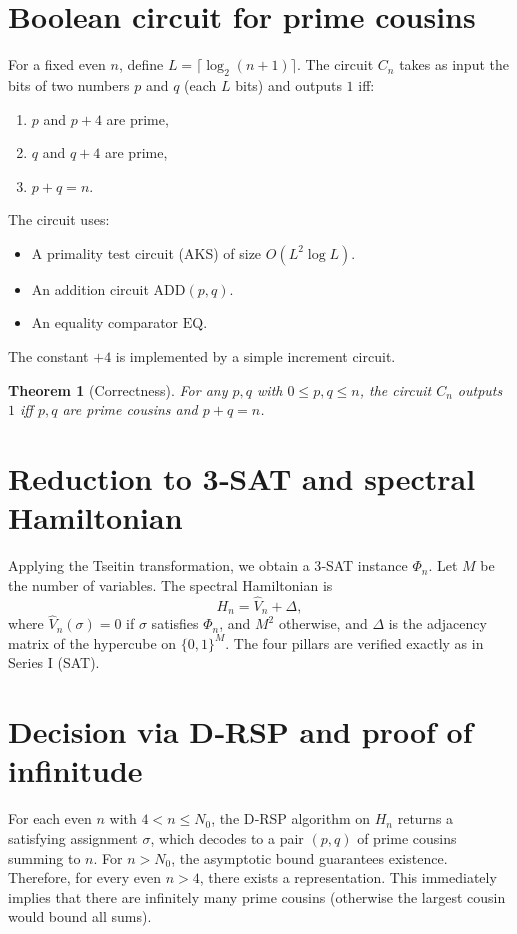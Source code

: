 \documentclass[11pt,a4paper]{article}
\newtheorem{theorem}{Theorem}[section]
\begin{document}
\section{Boolean circuit for prime cousins}

For a fixed even $n$, define $L = \lceil \log_2(n+1)\rceil$. The circuit $C_n$ takes as input the bits of two numbers $p$ and $q$ (each $L$ bits) and outputs $1$ iff:
\begin{enumerate}
\item $p$ and $p+4$ are prime,
\item $q$ and $q+4$ are prime,
\item $p+q = n$.
\end{enumerate}

The circuit uses:
\begin{itemize}
\item A primality test circuit (AKS) of size $O(L^2 \log L)$.
\item An addition circuit $\mathrm{ADD}(p,q)$.
\item An equality comparator $\mathrm{EQ}$.
\end{itemize}
The constant $+4$ is implemented by a simple increment circuit.

\begin{theorem}[Correctness]
For any $p,q$ with $0\le p,q\le n$, the circuit $C_n$ outputs $1$ iff $p,q$ are prime cousins and $p+q=n$.
\end{theorem}

\section{Reduction to 3‑SAT and spectral Hamiltonian}

Applying the Tseitin transformation, we obtain a 3‑SAT instance $\Phi_n$. Let $M$ be the number of variables. The spectral Hamiltonian is
\[
H_n = \hat{V}_n + \Delta,
\]
where $\hat{V}_n(\sigma) = 0$ if $\sigma$ satisfies $\Phi_n$, and $M^2$ otherwise, and $\Delta$ is the adjacency matrix of the hypercube on $\{0,1\}^M$. The four pillars are verified exactly as in Series I (SAT).

\section{Decision via D‑RSP and proof of infinitude}

For each even $n$ with $4 < n \le N_0$, the D‑RSP algorithm on $H_n$ returns a satisfying assignment $\sigma$, which decodes to a pair $(p,q)$ of prime cousins summing to $n$. For $n > N_0$, the asymptotic bound guarantees existence. Therefore, for every even $n > 4$, there exists a representation. This immediately implies that there are infinitely many prime cousins (otherwise the largest cousin would bound all sums).
\end{document}
